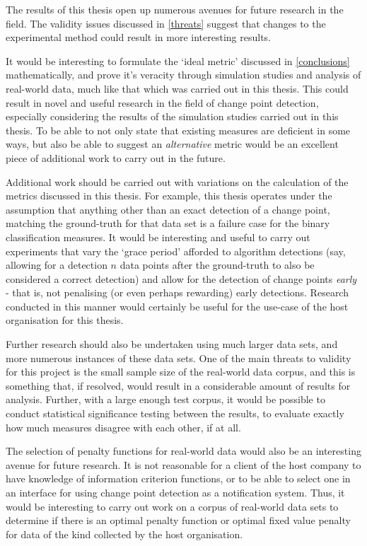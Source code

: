 \documentclass[../main.tex]{subfiles}
\begin{document}
The results of this thesis open up numerous avenues for future research in the field. The validity issues discussed in \autoref{threats} suggest that changes to the experimental method could result in more interesting results.

It would be interesting to formulate the `ideal metric' discussed in \autoref{conclusions} mathematically, and prove it's veracity through simulation studies and analysis of real-world data, much like that which was carried out in this thesis. This could result in novel and useful research in the field of change point detection, especially considering the results of the simulation studies carried out in this thesis. To be able to not only state that existing measures are deficient in some ways, but also be able to suggest an \emph{alternative} metric would be an excellent piece of additional work to carry out in the future.

Additional work should be carried out with variations on the calculation of the metrics discussed in this thesis. For example, this thesis operates under the assumption that anything other than an exact detection of a change point, matching the ground-truth for that data set is a failure case for the binary classification measures. It would be interesting and useful to carry out experiments that vary the `grace period' afforded to algorithm detections (say, allowing for a detection $n$ data points after the ground-truth to also be considered a correct detection) and allow for the detection of change points \emph{early} - that is, not penalising (or even perhaps rewarding) early detections. Research conducted in this manner would certainly be useful for the use-case of the host organisation for this thesis.

Further research should also be undertaken using much larger data sets, and more numerous instances of these data sets. One of the main threats to validity for this project is the small sample size of the real-world data corpus, and this is something that, if resolved, would result in a considerable amount of results for analysis. Further, with a large enough test corpus, it would be possible to conduct statistical significance testing between the results, to evaluate exactly how much measures disagree with each other, if at all.

The selection of penalty functions for real-world data would also be an interesting avenue for future research. It is not reasonable for a client of the host company to have knowledge of information criterion functions, or to be able to select one in an interface for using change point detection as a notification system. Thus, it would be interesting to carry out work on a corpus of real-world data sets to determine if there is an optimal penalty function or optimal fixed value penalty for data of the kind collected by the host organisation.
\end{document}
